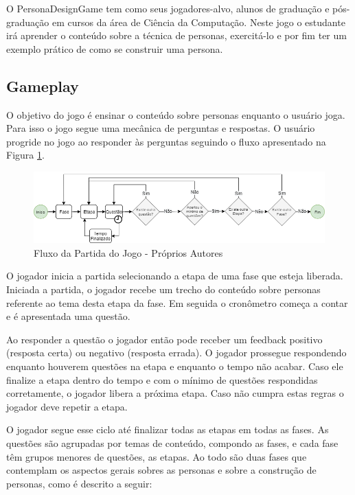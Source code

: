 O PersonaDesignGame tem como seus jogadores-alvo, alunos de graduação e pós-graduação em cursos da área de Ciência da Computação. Neste jogo o estudante irá aprender o conteúdo sobre a técnica de personas, exercitá-lo e por fim ter um exemplo prático de como se construir uma persona.

\subsection{Gameplay}

O objetivo do jogo é ensinar o conteúdo sobre personas enquanto o usuário joga. Para isso o jogo segue uma mecânica de perguntas e respostas. O usuário progride no jogo ao responder às perguntas seguindo o fluxo apresentado na Figura \ref{Fig:game_flow.png}.

\begin{figure}[htbp]
	\centering
		\includegraphics[keepaspectratio=true,scale=0.56]{figuras/game_flow.png}
		\caption{\textcolor{textmodified}{Fluxo da Partida do Jogo - Próprios Autores}}
	\label{Fig:game_flow.png}
\end{figure}

\newpage

{\color{textmodified}
O jogador inicia a partida selecionando a etapa de uma fase que esteja liberada. Iniciada a partida, o jogador recebe um trecho do conteúdo sobre personas referente ao tema desta etapa da fase. Em seguida o cronômetro começa a contar e é apresentada uma questão. 

Ao responder a questão o jogador então pode receber um feedback positivo (resposta certa) ou negativo (resposta errada). O jogador prossegue respondendo enquanto houverem questões na etapa e enquanto o tempo não acabar. Caso ele finalize a etapa dentro do tempo e com o mínimo de questões respondidas corretamente, o jogador libera a próxima etapa. Caso não cumpra estas regras o jogador deve repetir a etapa. 

O jogador segue esse ciclo até finalizar todas as etapas em todas as fases. As questões são agrupadas por temas de conteúdo, compondo as fases, e cada fase têm grupos menores de questões, as etapas. Ao todo são duas fases que contemplam os aspectos gerais sobres as personas e sobre a construção de personas, como é descrito a seguir:
}

